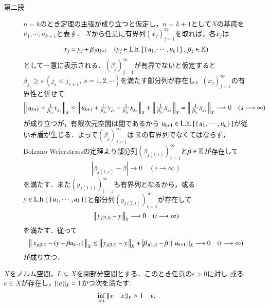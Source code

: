 \begin{prf}
\begin{description}
			\item[第二段]
				$n=k$のとき定理の主張が成り立つと仮定し，$n = k+1$として$X$の基底を$u_1,\cdots,u_{k+1}$と表す．
				$X$から任意に有界列$(x_j)_{j=1}^{\infty}$を取れば，各$x_j$は
				\begin{align}
					x_j = y_j + \beta_j u_{k+1} \quad (y_j \in \mathrm{L.h.}\left[\, \left\{\, u_1,\cdots,u_k\, \right\}\, \right],\ \beta_j \in \mathbb{K})
				\end{align}
				として一意に表示される．$(\beta_j)_{j=1}^{\infty}$が有界でないと仮定すると
				$\beta_{j_s} \geq s\ (j_s < j_{s+1},\ s=1,2,\cdots)$を満たす部分列が存在し，$(x_j)_{j=1}^{\infty}$の有界性と併せて
				\begin{align}
					\left\|\, u_{k+1} + \tfrac{1}{\beta_{j_s}}y_{j_s}\, \right\|_{X}
					\leq \left\|\, u_{k+1} + \tfrac{1}{\beta_{j_s}}y_{j_s} - \tfrac{1}{\beta_{j_s}}x_{j_s}\, \right\|_{X}
						+ \left\|\, \tfrac{1}{\beta_{j_s}}x_{j_s}\, \right\|_{X}
					= \left\|\, \tfrac{1}{\beta_{j_s}}x_{j_s}\, \right\|_{X} \longrightarrow 0 \quad (s \longrightarrow \infty)
				\end{align}
				が成り立つが，有限次元空間は閉であるから
				$u_{k+1} \in \mathrm{L.h.}\left[\, \left\{\, u_1,\cdots,u_k\, \right\}\, \right]$が従い矛盾が生じる．よって$(\beta_j)_{j=1}^{\infty}$は
				$\mathbb{K}$の有界列でなくてはならず，Bolzano-Weierstrassの定理より部分列$\left( \beta_{j(1,i)} \right)_{i=1}^{\infty}$と$\beta \in \mathbb{K}$が存在して
				\begin{align}
					\left| \beta_{j(1,i)} - \beta \right| \longrightarrow 0 \quad (i \longrightarrow \infty)
				\end{align}
				を満たす．また$\left(y_{j(1,i)}\right)_{i=1}^{\infty}$も有界列となるから，或る
				$y \in \mathrm{L.h.}\left[\, \left\{\, u_1,\cdots,u_k\, \right\}\, \right]$と部分列$\left(y_{j(2,i)}\right)_{i=1}^{\infty}$が存在して
				\begin{align}
					\left\|\, y_{j(2,i)} - y\, \right\|_{X} \longrightarrow 0 \quad (i \longrightarrow \infty)
				\end{align}
				を満たす．従って
				\begin{align}
					\left\|\, x_{j(2,i)} - \left(y + \beta u_{k+1}\right)\, \right\|_{X} \leq
					\left\|\, y_{j(2,i)} - y\, \right\|_{X} + \left| \beta_{j(1,i)} - \beta \right| \left\|\, u_{k+1}\, \right\|_{X}
					\longrightarrow 0 \quad (i \longrightarrow \infty)
				\end{align}
				が成り立つ．
				\QED
		\end{description}
	\end{prf}
	
	\begin{screen}
		\begin{thm}[閉部分空間との点の距離]
			$X$をノルム空間，$L \subsetneq X$を閉部分空間とする．このとき任意の$\epsilon > 0$に対し
			或る$e \in X$が存在し，$\left\|\, e\, \right\|_{X} = 1$かつ次を満たす:
			\begin{align}
				\operatorname*{inf}_{x \in L} \left\|\, e - x\, \right\|_{X} > 1 - \epsilon.
			\end{align}
			\label{thm:closed_subspace_distance}
		\end{thm}
	\end{screen}
	
